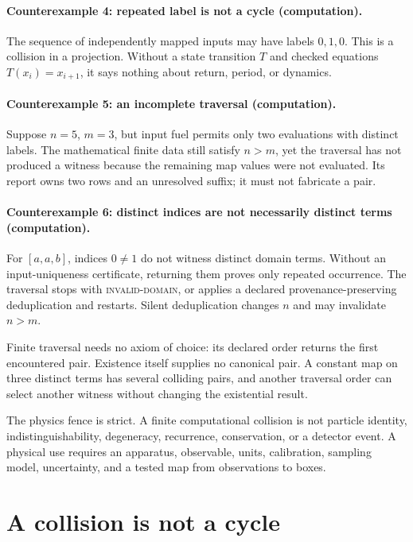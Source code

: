 \paragraph{Counterexample 4: repeated label is not a cycle (computation).}
The sequence of independently mapped inputs may have labels \(0,1,0\).  This is a collision in a projection.
Without a state transition \(T\) and checked equations \(T(x_i)=x_{i+1}\), it says nothing about return, period, or
dynamics.

\paragraph{Counterexample 5: an incomplete traversal (computation).}
Suppose \(n=5\), \(m=3\), but input fuel permits only two evaluations with distinct labels.  The mathematical finite
data still satisfy \(n>m\), yet the traversal has not produced a witness because the remaining map values were not
evaluated.  Its report owns two rows and an unresolved suffix; it must not fabricate a pair.

\paragraph{Counterexample 6: distinct indices are not necessarily distinct terms (computation).}
For \([a,a,b]\), indices \(0\ne1\) do not witness distinct domain terms.  Without an input-uniqueness certificate,
returning them proves only repeated occurrence.  The traversal stops with \textsc{invalid-domain}, or applies a
declared provenance-preserving deduplication and restarts.  Silent deduplication changes \(n\) and may invalidate
\(n>m\).

Finite traversal needs no axiom of choice: its declared order returns the first encountered pair.  Existence itself
supplies no canonical pair.  A constant map on three distinct terms has several colliding pairs, and another traversal
order can select another witness without changing the existential result.

The physics fence is strict.  A finite computational collision is not particle identity, indistinguishability,
degeneracy, recurrence, conservation, or a detector event.  A physical use requires an apparatus, observable, units,
calibration, sampling model, uncertainty, and a tested map from observations to boxes.

\section{A collision is not a cycle}

